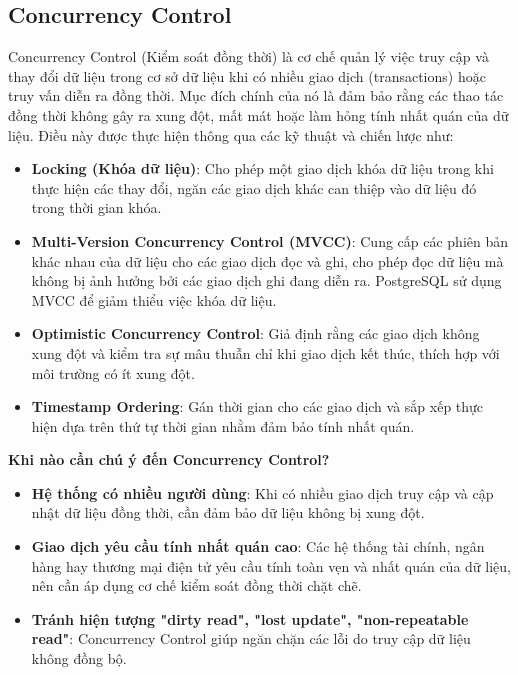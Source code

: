 \subsection{Concurrency Control}

Concurrency Control (Kiểm soát đồng thời) là cơ chế quản lý việc truy cập và thay đổi dữ liệu trong cơ sở dữ liệu khi có nhiều giao dịch (transactions) hoặc truy vấn diễn ra đồng thời. Mục đích chính của nó là đảm bảo rằng các thao tác đồng thời không gây ra xung đột, mất mát hoặc làm hỏng tính nhất quán của dữ liệu. Điều này được thực hiện thông qua các kỹ thuật và chiến lược như:

\begin{itemize}
    \item \textbf{Locking (Khóa dữ liệu)}: Cho phép một giao dịch khóa dữ liệu trong khi thực hiện các thay đổi, ngăn các giao dịch khác can thiệp vào dữ liệu đó trong thời gian khóa.
    \item \textbf{Multi-Version Concurrency Control (MVCC)}: Cung cấp các phiên bản khác nhau của dữ liệu cho các giao dịch đọc và ghi, cho phép đọc dữ liệu mà không bị ảnh hưởng bởi các giao dịch ghi đang diễn ra. PostgreSQL sử dụng MVCC để giảm thiểu việc khóa dữ liệu.
    \item \textbf{Optimistic Concurrency Control}: Giả định rằng các giao dịch không xung đột và kiểm tra sự mâu thuẫn chỉ khi giao dịch kết thúc, thích hợp với môi trường có ít xung đột.
    \item \textbf{Timestamp Ordering}: Gán thời gian cho các giao dịch và sắp xếp thực hiện dựa trên thứ tự thời gian nhằm đảm bảo tính nhất quán.
\end{itemize}

\noindent
\textbf{Khi nào cần chú ý đến Concurrency Control?}
\begin{itemize}
    \item \textbf{Hệ thống có nhiều người dùng}: Khi có nhiều giao dịch truy cập và cập nhật dữ liệu đồng thời, cần đảm bảo dữ liệu không bị xung đột.
    \item \textbf{Giao dịch yêu cầu tính nhất quán cao}: Các hệ thống tài chính, ngân hàng hay thương mại điện tử yêu cầu tính toàn vẹn và nhất quán của dữ liệu, nên cần áp dụng cơ chế kiểm soát đồng thời chặt chẽ.
    \item \textbf{Tránh hiện tượng "dirty read", "lost update", "non-repeatable read"}: Concurrency Control giúp ngăn chặn các lỗi do truy cập dữ liệu không đồng bộ.
\end{itemize}

